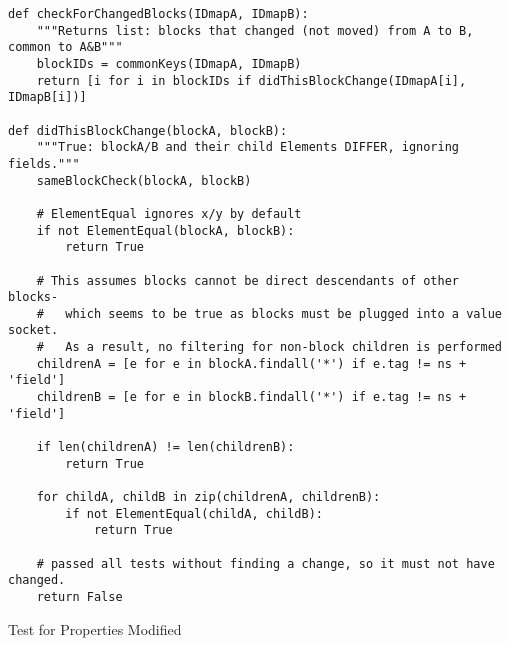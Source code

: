 \begin{listing}[]
\begin{verbatim}
def checkForChangedBlocks(IDmapA, IDmapB):
    """Returns list: blocks that changed (not moved) from A to B, common to A&B"""
    blockIDs = commonKeys(IDmapA, IDmapB)
    return [i for i in blockIDs if didThisBlockChange(IDmapA[i], IDmapB[i])]

def didThisBlockChange(blockA, blockB):
    """True: blockA/B and their child Elements DIFFER, ignoring fields."""
    sameBlockCheck(blockA, blockB)

    # ElementEqual ignores x/y by default
    if not ElementEqual(blockA, blockB):
        return True

    # This assumes blocks cannot be direct descendants of other blocks-
    #   which seems to be true as blocks must be plugged into a value socket.
    #   As a result, no filtering for non-block children is performed
    childrenA = [e for e in blockA.findall('*') if e.tag != ns + 'field']
    childrenB = [e for e in blockB.findall('*') if e.tag != ns + 'field']

    if len(childrenA) != len(childrenB):
        return True

    for childA, childB in zip(childrenA, childrenB):
        if not ElementEqual(childA, childB):
            return True

    # passed all tests without finding a change, so it must not have changed.
    return False
\end{verbatim}
\caption{Test for Properties Modified}
\label{src:lst:properties-modified}
\end{listing}








